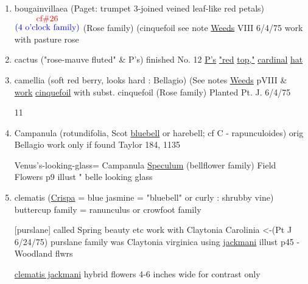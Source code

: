 \documentclass[a4paper,9pt]{article}
\begin{document}
\begin{enumerate}
\item bougainvillaea (Paget: trumpet 3-joined
veined leaf-like red petals) {$\stackrel{\hbox{\color{red}{cf\#26}}}{\hbox{\color{blue}{(4 o'clock family)}}}$}
\color{red}
(Rose family) (cinquefoil see note \ul{Weeds} VIII 6/4/75 work with 
pasture rose
\color{black}
\item cactus ("rose-mauve fluted" \& P's)
\color{blue}
finished 
No. 12
\ul{P's} \ul{"red} \ul{top,"} \ul{cardinal} \ul{hat}
\color{black}
\item camellia (soft red berry, looks hard : Bellagio)
(See notes \ul{Weeds} 
pVIII \& \ul{work} \ul{cinquefoil} with %
subst. cinquefoil (Rose family) Planted Pt. J. 6/4/75

\color{blue}11
\color{black}
\item Campanula (rotundifolia, Scot \ul{bluebell}
 or harebell; cf C - rapunculoides)
\color{red}
orig 
Bellagio
work only if found
\color{blue}
Taylor
184, 1135 

Venus's-looking-glass= Campanula \ul{Speculum} (bellflower family)
\color{red}
Field Flowers p9 illust " belle looking glass
\color{black}
\item clematis (\ul{Crispa} \color{blue}= \color{black} blue jasmine \color{blue}= \color{black} "bluebell"
or curly : shrubby vine)
\color{blue}
buttercup 
family \color{red}= ranunculus or crowfoot family

[purslane]
\color{red}
called Spring 
beauty etc
work with Claytonia Carolinia <-(Pt J 6/24/75)
\tiny
\color{blue}purslane family
\normalsize
\color{red}
was Claytonia virginica using \ul{jackmani}
illust p45 - Woodland flwrs

\ul{clematis jackmani}
hybrid flowers
4-6 inches wide
for contrast only
\end{enumerate}
\end{document}
